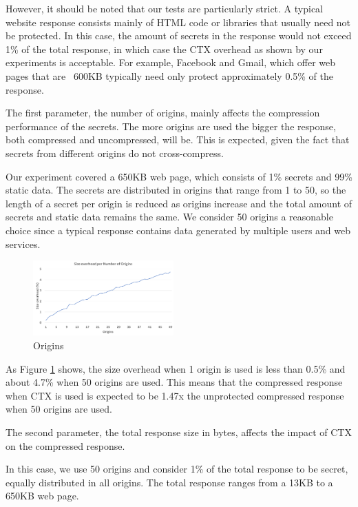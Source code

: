 \documentclass[conference, letterpaper, 10pt]{IEEEtran}
\begin{document}
However, it should be noted that our tests are particularly strict. A typical
website response consists mainly of HTML code or libraries that usually need not
be protected. In this case, the amount of secrets in the response would not
exceed 1\% of the total response, in which case the CTX overhead as shown by our
experiments is acceptable. For example, Facebook and Gmail, which offer web
pages that are ~600KB typically need only protect approximately 0.5\% of the
response.

The first parameter, the number of origins, mainly affects the compression
performance of the secrets. The more origins are used the bigger the response,
both compressed and uncompressed, will be. This is expected, given the fact that
secrets from different origins do not cross-compress.

Our experiment covered a 650KB web page, which consists of 1\% secrets and 99\%
static data. The secrets are distributed in origins that range from 1 to 50, so
the length of a secret per origin is reduced as origins increase and the total
amount of secrets and static data remains the same. We consider 50 origins a
reasonable choice since a typical response contains data generated by multiple
users and web services.

    \begin{figure}[thpb]
        \centering
            \includegraphics[width=0.48\textwidth]{experiments/origins.png}
        \caption{Origins}
        \label{fig:origin_ctx}
    \end{figure}

As Figure \ref{fig:origin_ctx} shows, the size overhead when 1 origin is used is less than 0.5\%
and about 4.7\% when 50 origins are used. This means that the compressed
response when CTX is used is expected to be 1.47x the unprotected compressed
response when 50 origins are used.

The second parameter, the total response size in bytes, affects the impact of
CTX on the compressed response.

In this case, we use 50 origins and consider 1\% of the total response to be
secret, equally distributed in all origins. The total response ranges from a
13KB to a 650KB web page.
\end{document}
